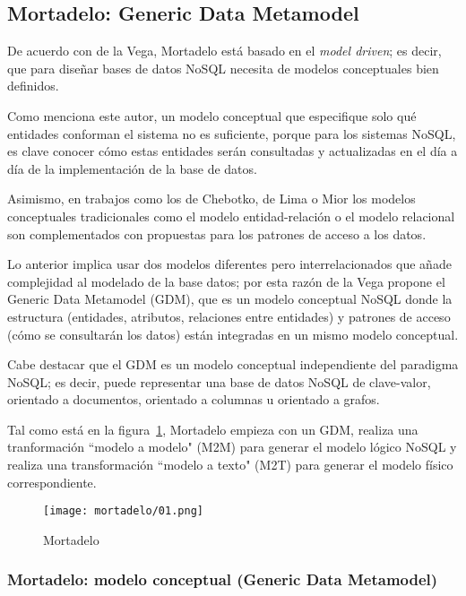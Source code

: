 \subsection{Mortadelo: Generic Data Metamodel}
De acuerdo con de la Vega\cite{de_la_vega_mortadelo_2020}, Mortadelo está basado en el \textit{model driven}; es decir, que para diseñar bases de datos NoSQL necesita de modelos conceptuales bien definidos.


Como menciona este autor, un modelo conceptual que especifique solo qué entidades conforman el sistema no es suficiente, porque para los sistemas NoSQL, es clave conocer cómo estas entidades serán consultadas y actualizadas en el día a día de la implementación de la base de datos.


Asimismo, en trabajos como los de Chebotko\cite{chebotko_big_2015}, de Lima\cite{de_lima_workload-driven_2015} o Mior\cite{mior_nose_2017-1} los modelos conceptuales tradicionales como el modelo entidad-relación o el modelo relacional son complementados con propuestas para los patrones de acceso a los datos.


Lo anterior implica usar dos modelos diferentes pero interrelacionados que añade complejidad al modelado de la base datos; por esta razón de la Vega propone el Generic Data Metamodel (GDM), que es un modelo conceptual NoSQL donde la estructura (entidades, atributos, relaciones entre entidades) y patrones de acceso (cómo se consultarán los datos) están integradas en un mismo modelo conceptual.


Cabe destacar que el GDM es un modelo conceptual independiente del paradigma NoSQL; es decir, puede representar una base de datos NoSQL de clave-valor, orientado a documentos, orientado a columnas u orientado a grafos.


Tal como está en la figura~\ref{img:mortadelo-process}, Mortadelo empieza con un GDM, realiza una tranformación ``modelo a modelo" (M2M) para generar el modelo lógico NoSQL y realiza una transformación ``modelo a texto" (M2T) para generar el modelo físico correspondiente.


\begin{figure}[h!t] 
    \centering
    \texttt{[image: mortadelo/01.png]}
    \caption{Mortadelo}
    \label{img:mortadelo-process}
\end{figure}

\subsubsection*{Mortadelo: modelo conceptual (Generic Data Metamodel)}

